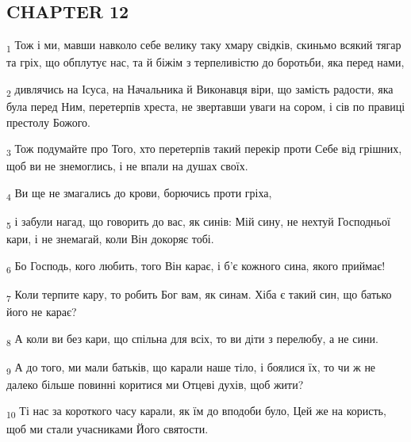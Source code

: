 \subsection{CHAPTER 12}
\begin{tcolorbox}
\textsubscript{1} Тож і ми, мавши навколо себе велику таку хмару свідків, скиньмо всякий тягар та гріх, що обплутує нас, та й біжім з терпеливістю до боротьби, яка перед нами,
\end{tcolorbox}
\begin{tcolorbox}
\textsubscript{2} дивлячись на Ісуса, на Начальника й Виконавця віри, що замість радости, яка була перед Ним, перетерпів хреста, не звертавши уваги на сором, і сів по правиці престолу Божого.
\end{tcolorbox}
\begin{tcolorbox}
\textsubscript{3} Тож подумайте про Того, хто перетерпів такий перекір проти Себе від грішних, щоб ви не знемоглись, і не впали на душах своїх.
\end{tcolorbox}
\begin{tcolorbox}
\textsubscript{4} Ви ще не змагались до крови, борючись проти гріха,
\end{tcolorbox}
\begin{tcolorbox}
\textsubscript{5} і забули нагад, що говорить до вас, як синів: Мій сину, не нехтуй Господньої кари, і не знемагай, коли Він докоряє тобі.
\end{tcolorbox}
\begin{tcolorbox}
\textsubscript{6} Бо Господь, кого любить, того Він карає, і б'є кожного сина, якого приймає!
\end{tcolorbox}
\begin{tcolorbox}
\textsubscript{7} Коли терпите кару, то робить Бог вам, як синам. Хіба є такий син, що батько його не карає?
\end{tcolorbox}
\begin{tcolorbox}
\textsubscript{8} А коли ви без кари, що спільна для всіх, то ви діти з перелюбу, а не сини.
\end{tcolorbox}
\begin{tcolorbox}
\textsubscript{9} А до того, ми мали батьків, що карали наше тіло, і боялися їх, то чи ж не далеко більше повинні коритися ми Отцеві духів, щоб жити?
\end{tcolorbox}
\begin{tcolorbox}
\textsubscript{10} Ті нас за короткого часу карали, як їм до вподоби було, Цей же на користь, щоб ми стали учасниками Його святости.
\end{tcolorbox}
